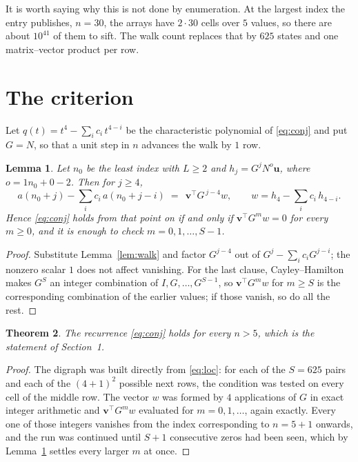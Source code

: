 \documentclass[11pt,a4paper]{article}
\theoremstyle{plain}
\newtheorem{theorem}{Theorem}
\newtheorem{lemma}[theorem]{Lemma}
\theoremstyle{definition}
\begin{document}
It is worth saying why this is not done by enumeration. At the largest index the entry
publishes, $n=30$, the arrays have $2\cdot30$ cells over
$5$ values, so there are about $10^{41}$ of them to sift. The
walk count replaces that by $625$ states and one matrix--vector product per row.
\section{The criterion}

Let $q(t)=t^{4}-\sum_i c_i\,t^{4-i}$ be the characteristic polynomial of
\eqref{eq:conj} and put $G=N$, so that a unit step in $n$ advances the walk by
$1$ row.

\begin{lemma}\label{lem:crit}
Let $n_0$ be the least index with $L\ge2$ and $h_j=G^{j}N^{o}\mathbf{u}$, where
$o=1n_0+0-2$. Then for $j\ge4$,
\[
a(n_0+j)-\sum_i c_i\,a(n_0+j-i)\;=\;\,\mathbf{v}^{\!\top}G^{\,j-4}w,
\qquad w=h_{4}-\sum_i c_i\,h_{4-i} .
\]
Hence \eqref{eq:conj} holds from that point on if and only if
$\mathbf{v}^{\!\top}G^{m}w=0$ for every $m\ge0$, and it is enough to check
$m=0,1,\dots,S-1$.
\end{lemma}

\begin{proof}
Substitute Lemma~\ref{lem:walk} and factor $G^{j-4}$ out of
$G^{j}-\sum_ic_iG^{j-i}$; the nonzero scalar $1$ does not affect
vanishing. For the last clause, Cayley--Hamilton makes $G^{S}$ an integer combination of
$I,G,\dots,G^{S-1}$, so $\mathbf{v}^{\!\top}G^{m}w$ for $m\ge S$ is the corresponding
combination of the earlier values; if those vanish, so do all the rest.
\end{proof}

\begin{theorem}
The recurrence \eqref{eq:conj} holds for every $n>5$, which is the statement of
Section~1.
\end{theorem}

\begin{proof}
The digraph was built directly from \eqref{eq:loc}: for each of the $S=625$ pairs and each
of the $(4+1)^{2}$ possible next rows, the condition was tested on every cell of
the middle row. The vector $w$ was formed by $4$ applications of $G$ in exact integer
arithmetic and $\mathbf{v}^{\!\top}G^{m}w$ evaluated for $m=0,1,\dots$, again exactly.
Every one of those integers vanishes from the index corresponding to $n=5+1$ onwards,
and the run was continued until $S+1$ consecutive zeros had been seen, which by
Lemma~\ref{lem:crit} settles every larger $m$ at once.
\end{proof}
\end{document}
